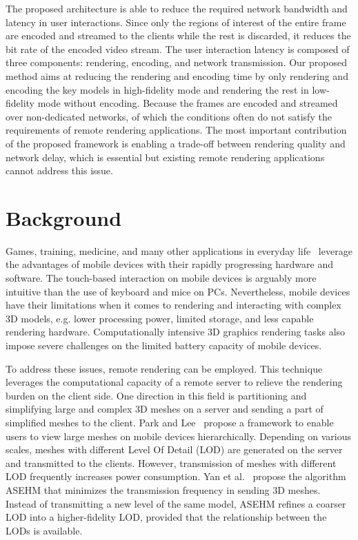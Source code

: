 The proposed architecture is able to reduce the required network bandwidth and latency in user interactions.
Since only the regions of interest of the entire frame are encoded and streamed to the clients while the rest is discarded, it reduces the bit rate of the encoded video stream.
The user interaction latency is composed of three components: rendering, encoding, and network transmission. Our proposed method aims at reducing the rendering and encoding time by only rendering and encoding the key models in high-fidelity mode and rendering the rest in low-fidelity mode without encoding.
Because the frames are encoded and streamed over non-dedicated networks, of which the conditions often do not satisfy the requirements of remote rendering applications. The most important contribution of the proposed framework is enabling a trade-off between rendering quality and network delay, which is essential but existing remote rendering applications cannot address this issue.

\section{Background}
\label{sec:hrr:bg}

Games, training, medicine, and many other applications in everyday life~\cite{ramanathan2007,chun2011,kwon2017,rodriguez-gil2017} leverage the advantages of mobile devices with their rapidly progressing hardware and software.
The touch-based interaction on mobile devices is arguably more intuitive than the use of keyboard and mice on PCs. Nevertheless, mobile devices have their limitations when it comes to rendering and interacting with complex 3D models, e.g. lower processing power, limited storage, and less capable rendering hardware.
Computationally intensive 3D graphics rendering tasks also impose severe challenges on the limited battery capacity of mobile devices.

To address these issues, remote rendering can be employed. This technique leverages the computational capacity of a remote server to relieve the rendering burden on the client side.
One direction in this field is partitioning and simplifying large and complex 3D meshes on a server and sending a part of simplified meshes to the client. Park and Lee~\cite{park2016} propose a framework to enable users to view large meshes on mobile devices hierarchically. Depending on various scales, meshes with different Level Of Detail (LOD) are generated on the server and transmitted to the clients.
However, transmission of meshes with different LOD frequently increases power consumption. Yan et al.~\cite{yan2014} propose the algorithm ASEHM that minimizes the transmission frequency in sending 3D meshes. Instead of transmitting a new level of the same model, ASEHM refines a coarser LOD into a higher-fidelity LOD, provided that the relationship between the LODs is available.

